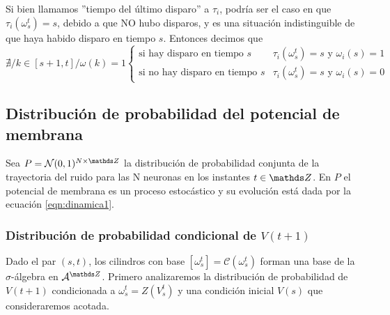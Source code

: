 Si bien llamamos ''tiempo del último disparo'' a $\tau_i$, podría ser el caso en que $\tau_i(\omega_s^t)=s$, debido a que NO hubo disparos, y es una situación indistinguible de que haya habido disparo en tiempo $s$.
Entonces decimos que
\begin{equation*}
    \nexists / k \in [s+1,t] / \omega(k)=1 \left\{ \begin{array}{ll}
        \text{si hay disparo en tiempo }s   & \tau_i(\omega_s^t)=s \text{ y }  \omega_i(s) = 1 \\ 
        \text{si no hay disparo en tiempo }s   & \tau_i(\omega_s^t)=s \text{ y }  \omega_i(s) = 0
    \end{array}\right.
\end{equation*}

\subsection{Distribución de probabilidad del potencial de membrana}

Sea $P = \mathcal{N}(0,1)^{N \times \enteros}$ la distribución de probabilidad conjunta de la trayectoria del ruido para las N neuronas en los instantes $t\in \enteros$. En $P$ el potencial de membrana es un proceso estocástico y su evolución está dada por la ecuación \eqref{eqn:dinamica1}.

\subsubsection{Distribución de probabilidad condicional de $V(t+1)$}

Dado el par $(s,t)$, los cilindros con base $[\omega_s^t]=\mathcal{C}(\omega_s^t)$ forman una base de la $\sigma$-álgebra en $\mathcal{A}^{\enteros}$. 
Primero analizaremos la distribución de probabilidad de $V(t+1)$ condicionada a $\omega_s^t=Z(V_s^t)$ y una condición inicial $V(s)$ que consideraremos acotada.

